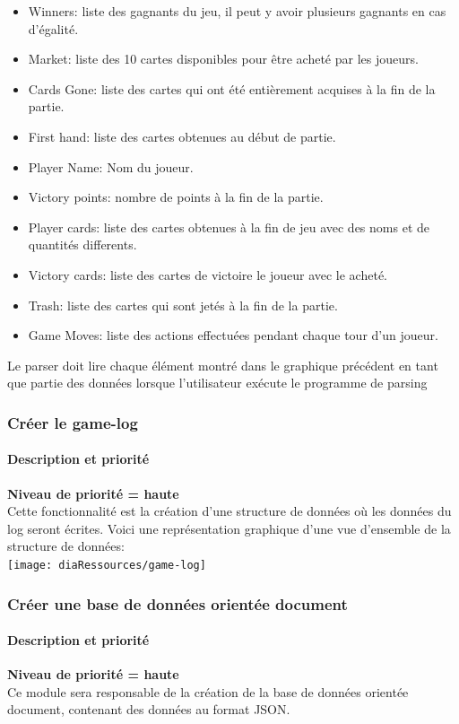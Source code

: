 \begin{itemize}
\item Winners: liste des gagnants du jeu, il peut y avoir plusieurs gagnants en cas d'égalité.
\item Market: liste des 10 cartes disponibles pour être acheté par les joueurs.
\item Cards Gone: liste des cartes qui ont été entièrement acquises à la fin de la partie.
\item First hand: liste des cartes obtenues au début de partie.%
\item Player Name: Nom du joueur.
\item Victory points: nombre de points à la fin de la partie.
\item Player cards: liste des cartes obtenues à la fin de jeu avec des noms et de quantités differents.
\item Victory cards: liste des cartes de victoire le joueur avec le acheté.
\item Trash: liste des cartes qui sont jetés à la fin de la partie.
\item Game Moves: liste des actions effectuées pendant chaque tour d'un joueur.
\end{itemize}
Le parser doit lire chaque élément montré dans le graphique précédent en tant que partie des données lorsque l'utilisateur exécute le programme de parsing\\

\subsubsection{Créer le game-log}
\paragraph*{Description et priorité}
\textbf{Niveau de priorité = haute}\\
Cette fonctionnalité est la création d'une structure de données où les données du log seront écrites.
Voici une représentation graphique d'une vue d'ensemble de la structure de données:\\
\texttt{[image: diaRessources/game-log]}

\subsubsection{Créer une base de données orientée document }

\paragraph*{Description et priorité}
\textbf{Niveau de priorité = haute}\\
Ce module sera responsable de la création de la base de données orientée document, contenant des données au format JSON.
